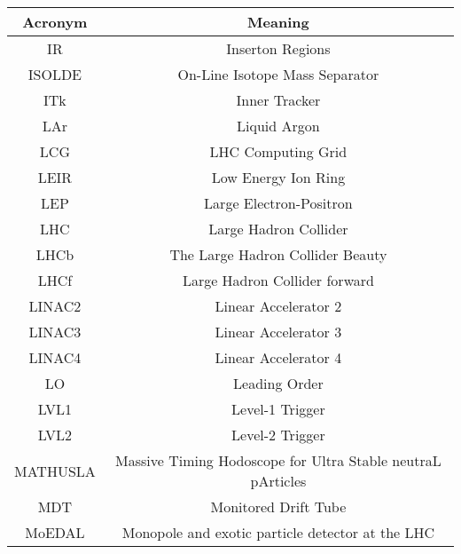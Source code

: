 \begin{tabular}{|c|c|}
\bottomrule

\end{tabular}

\def\arraystretch{1.5}
\begin{tabular}{|c|c|}
\hline
\toprule
Acronym & Meaning \\ \midrule
IR          & Inserton Regions                                                    \\
ISOLDE      & On-Line Isotope Mass Separator                                      \\
ITk         & Inner Tracker                                                       \\ 
LAr         & Liquid Argon                                                        \\
LCG         & LHC Computing Grid                                                  \\
LEIR        & Low Energy Ion Ring                                                 \\
LEP         & Large Electron-Positron                                             \\
LHC         & Large Hadron Collider                                               \\
LHCb        & The Large Hadron Collider Beauty                                    \\
LHCf        & Large Hadron Collider forward                                       \\
LINAC2      & Linear Accelerator 2                                                \\
LINAC3      & Linear Accelerator 3                                                \\
LINAC4      & Linear Accelerator 4                                                \\
LO          & Leading Order                                                       \\
LVL1        & Level-1 Trigger                                                     \\
LVL2        & Level-2 Trigger                                                     \\
MATHUSLA    & \small Massive Timing Hodoscope for Ultra Stable neutraL pArticles         \\
MDT         & Monitored Drift Tube                                                \\
MoEDAL      & Monopole and exotic particle detector at the LHC                    \\

\end{tabular}
